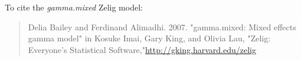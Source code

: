 To cite the \emph{ gamma.mixed } Zelig model:
 \begin{verse}
 Delia Bailey and Ferdinand Alimadhi. 2007. "gamma.mixed: Mixed effects gamma model" in Kosuke Imai, Gary King, and Olivia Lau, "Zelig: Everyone's Statistical Software,"\url{http://gking.harvard.edu/zelig} 
\end{verse}